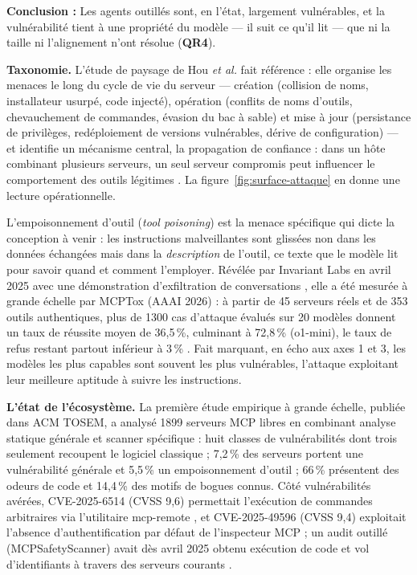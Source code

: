 \begin{encadre}
\textbf{Conclusion :} Les agents outillés sont, en l'état, largement vulnérables, et la vulnérabilité tient à une propriété du modèle --- il suit ce qu'il lit --- que ni la taille ni l'alignement n'ont résolue (\textbf{QR4}).
\end{encadre}


\textbf{Taxonomie.} L'étude de paysage de Hou \emph{et al.} fait référence : elle organise les menaces le long du cycle de vie du serveur --- création (collision de noms, installateur usurpé, code injecté), opération (conflits de noms d'outils, chevauchement de commandes, évasion du bac à sable) et mise à jour (persistance de privilèges, redéploiement de versions vulnérables, dérive de configuration) --- et identifie un mécanisme central, la propagation de confiance : dans un hôte combinant plusieurs serveurs, un seul serveur compromis peut influencer le comportement des outils légitimes \cite{hou}. La figure~\ref{fig:surface-attaque} en donne une lecture opérationnelle.

L'empoisonnement d'outil (\emph{tool poisoning}) est la menace spécifique qui dicte la conception à venir : les instructions malveillantes sont glissées non dans les données échangées mais dans la \emph{description} de l'outil, ce texte que le modèle lit pour savoir quand et comment l'employer. Révélée par Invariant Labs en avril 2025 avec une démonstration d'exfiltration de conversations \cite{invariant}, elle a été mesurée à grande échelle par MCPTox (AAAI 2026) : à partir de 45 serveurs réels et de 353 outils authentiques, plus de 1300 cas d'attaque évalués sur 20 modèles donnent un taux de réussite moyen de 36,5\,\%, culminant à 72,8\,\% (o1-mini), le taux de refus restant partout inférieur à 3\,\% \cite{mcptox}. Fait marquant, en écho aux axes 1 et 3, les modèles les plus capables sont souvent les plus vulnérables, l'attaque exploitant leur meilleure aptitude à suivre les instructions.

\textbf{L'état de l'écosystème.} La première étude empirique à grande échelle, publiée dans ACM TOSEM, a analysé 1899 serveurs MCP libres en combinant analyse statique générale et scanner spécifique \cite{hasan} : huit classes de vulnérabilités dont trois seulement recoupent le logiciel classique ; 7,2\,\% des serveurs portent une vulnérabilité générale et 5,5\,\% un empoisonnement d'outil ; 66\,\% présentent des odeurs de code et 14,4\,\% des motifs de bogues connus. Côté vulnérabilités avérées, CVE-2025-6514 (CVSS 9,6) permettait l'exécution de commandes arbitraires via l'utilitaire mcp-remote \cite{cve6514}, et CVE-2025-49596 (CVSS 9,4) exploitait l'absence d'authentification par défaut de l'inspecteur MCP \cite{cve49596} ; un audit outillé (MCPSafetyScanner) avait dès avril 2025 obtenu exécution de code et vol d'identifiants à travers des serveurs courants \cite{radosevich}.

